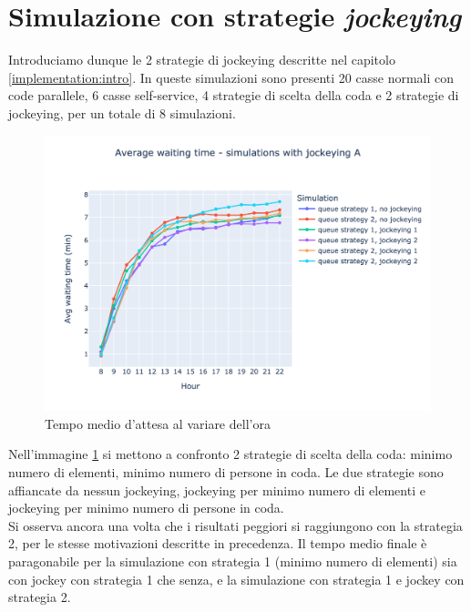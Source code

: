 \section{Simulazione con strategie \textit{jockeying}}

Introduciamo dunque le 2 strategie di jockeying descritte nel capitolo
\ref{implementation:intro}. In queste simulazioni sono presenti 20
casse normali con code parallele, 6 casse self-service, 4 strategie di
scelta della coda e 2 strategie di jockeying, per un totale di 8
simulazioni.

\begin{figure}[H]
	\centering
	\includegraphics[width=12cm]{"images/results/avg_wt_jockey_a.png"}
	
	\caption{Tempo medio d'attesa al variare dell'ora}
	\label{fig:avg_wt_jockey_a}
\end{figure}

Nell'immagine \ref{fig:avg_wt_jockey_a} si mettono a confronto 2 strategie di scelta della coda: minimo numero di elementi, minimo numero di persone in coda. Le due strategie sono affiancate da nessun jockeying, jockeying per minimo numero di elementi e jockeying per minimo numero di persone in coda. \\
Si osserva ancora una volta che i risultati peggiori si raggiungono
con la strategia 2, per le stesse motivazioni descritte in
precedenza. Il tempo medio finale è paragonabile per la simulazione
con strategia 1 (minimo numero di elementi) sia con jockey con
strategia 1 che senza, e la simulazione con strategia 1 e jockey con
strategia 2.

